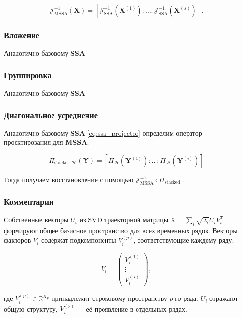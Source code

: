\documentclass[a4paper, 11pt]{article}
\newcommand{\SSA}{\textbf{SSA}}
\newcommand{\MSSA}{\textbf{MSSA}}
\begin{document}
\[
	\mathcal{J}^{-1}_{\text{MSSA}}(\mathbf{X}) = [\mathcal{J}^{-1}_{\text{SSA}}(\mathbf{X}^{(1)}) : \ldots : \mathcal{J}^{-1}_{\text{SSA}}(\mathbf{X}^{(s)})].
\]



\subsubsection{Вложение}

Аналогично базовому $\SSA$.

\subsubsection{Группировка}

Аналогично базовому $\SSA$.

\subsubsection{Диагональное усреднение}

Аналогично базовому $\SSA$ \eqref{eq:ssa_projector} определим оператор проектирования для $\MSSA$:

\[
	\Pi_{\text{stacked } \mathcal{H}}(\mathbf{Y}) = [\Pi_{\mathcal{H}}(\mathbf{Y}^{(1)}) : \ldots : \Pi_{\mathcal{H}}(\mathbf{Y}^{(i)})]
\]

Тогда получаем восстановление с помощью $\mathcal{J}_{\text{MSSA}}^{-1} \circ \Pi_{\text{stacked }}$.




\subsubsection{Комментарии}


Собственные векторы $U_i$ из SVD траекторной матрицы $\mathrm{X} = \sum_i \sqrt{\lambda_i} U_i V_i^{\mathsf{T}}$ формируют общее базисное пространство для всех временных рядов. Векторы факторов $V_i$ содержат подкомпоненты $V_i^{(p)}$, соответствующие каждому ряду:

\begin{equation*}
	V_i = \begin{pmatrix} V_i^{(1)} \\ \vdots \\ V_i^{(s)} \end{pmatrix},
\end{equation*}

где $V_i^{(p)} \in \mathbb{R}^{K_p}$ принадлежит строковому пространству $p$-го ряда. $U_i$ отражают общую структуру, $V_i^{(p)}$ — её проявление в отдельных рядах.
\end{document}
